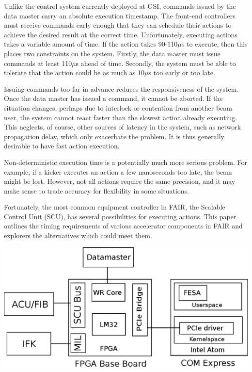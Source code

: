 \documentclass[25pt,halfparskip-,pagesize]{scrartcl}
\begin{document}
\begin{multicols*}{3}
Unlike the control system currently deployed at GSI,
commands issued by the data master carry an absolute execution timestamp.
The front-end controllers must receive commands early enough
that they can schedule their actions
to achieve the desired result at the correct time.
Unfortunately, executing actions takes a variable amount of time.
If the action takes 90-110$\mu$s to execute,
then this places two constraints on the system.
Firstly, the data master must issue commands at least 110$\mu$s ahead of time.
Secondly, the system must be able to tolerate that the action could be as
much as 10$\mu$s too early or too late.


Issuing commands too far in advance reduces the responsiveness of the system.
Once the data master has issued a command, it cannot be aborted.
If the situation changes,
perhaps due to interlock or contention from another beam user,
the system cannot react faster than the slowest action already executing.
This neglects, of course, other sources of latency in the system,
such as network propagation delay, which only exacerbate the problem.
It is thus generally desirable to have fast action execution.

Non-deterministic execution time is a potentially much more serious problem.
For example, if a kicker executes an action a few nanoseconds too late,
the beam might be lost.
However, not all actions require the same precision,
and it may make sense to trade accuracy for flexibility in some situations.

Fortunately, the  most common equipment controller in FAIR,
the Scalable Control Unit (SCU),
has several possibilities for executing actions.
This paper outlines the timing requirements of various accelerator
components in FAIR and explorers the alternatives which could meet them.



\includegraphics[width=\columnwidth]{../images/WEPD48f2}


\end{multicols*}
\end{document}
